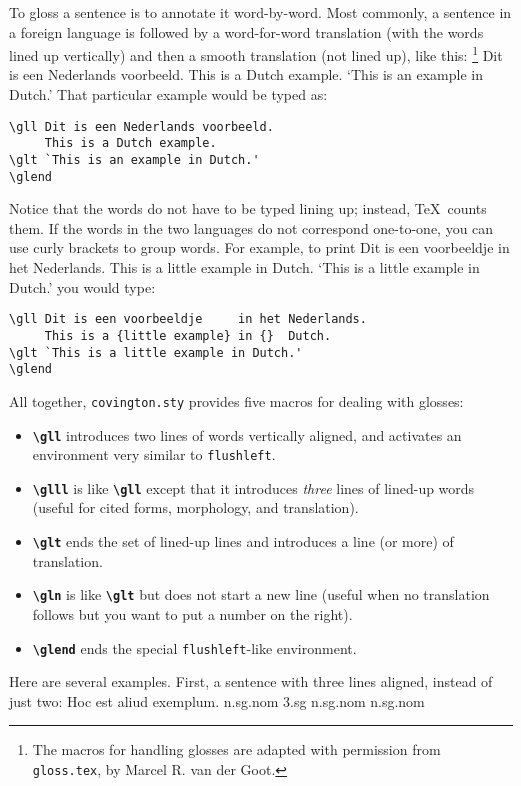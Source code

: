 \documentclass[english]{article}
\newcommand*\jmacro[1]{\textbf{\texttt{#1}}}
\newcommand*\jcsmacro[1]{\jmacro{\textbackslash{#1}}}
\newcommand*\jfenv[1]{\texttt{#1}}
\begin{document}
To gloss a sentence is to annotate it word-by-word.  Most commonly, a 
sentence in a foreign language is followed by a word-for-word 
translation (with the words lined up vertically) and then a smooth 
translation (not lined up), like this:%
\footnote{The macros for handling glosses are adapted with permission 
from \texttt{gloss.tex}, by Marcel R. van der Goot.}
\gll Dit is een Nederlands voorbeeld. 
     This is a Dutch example. 
\glt `This is an example in Dutch.'
\glend
That particular example would be typed as:
\begin{lstlisting}[moretexcs={gll,glt,glend}]
\gll Dit is een Nederlands voorbeeld. 
     This is a Dutch example. 
\glt `This is an example in Dutch.'
\glend
\end{lstlisting}
Notice that the words do not have to be typed lining up; instead, \TeX\ 
counts them.  If the words in the two languages do not correspond 
one-to-one, you can use curly brackets to group words.
For example, to print
\gll Dit is een voorbeeldje     in het Nederlands.
     This is a {little example} in {}  Dutch.
\glt `This is a little example in Dutch.'
\glend
you would type:
\begin{lstlisting}[moretexcs={gll,glt,glend}]
\gll Dit is een voorbeeldje     in het Nederlands.
     This is a {little example} in {}  Dutch.
\glt `This is a little example in Dutch.'
\glend
\end{lstlisting}
All together, \texttt{covington.sty} provides five macros for dealing with
glosses:
\begin{itemize}
\item \jcsmacro{gll} introduces two lines of words vertically aligned, and 
activates an environment very similar to \jfenv{flushleft}.
\item \jcsmacro{glll} is like \jcsmacro{gll} except that it introduces
\emph{three} lines of lined-up words (useful for cited forms, morphology,
and translation).
\item \jcsmacro{glt} ends the set of lined-up lines and introduces a line 
(or more) of translation.
\item \jcsmacro{gln} is like \jcsmacro{glt} but does not start a new line 
(useful when no translation follows but you want to put a number on the 
right).
\item \jcsmacro{glend} ends the special \jfenv{flushleft}-like environment.
\end{itemize}
Here are several examples.  First, a sentence with three lines aligned, 
instead of just two:
\glll  Hoc est aliud exemplum.
       n.sg.nom 3.sg n.sg.nom n.sg.nom
\end{document}
